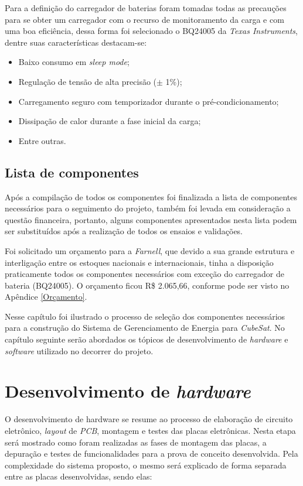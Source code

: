 \documentclass[
	12pt,				%
	openright,			%
	oneside,			%
	a4paper,			%
	english,			%
	french,				%
	spanish,			%
	brazil,				%
	oldfontcommands
	]{abntex2}
\begin{document}
	Para a definição do carregador de baterias foram tomadas todas as precauções para se obter um carregador com o recurso de monitoramento da carga e com uma boa eficiência, dessa forma foi selecionado o BQ24005 da \textit{Texas Instruments}, dentre suas características destacam-se:
	
	\begin{itemize}
		\item Baixo consumo em \textit{sleep mode};
		\item Regulação de tensão de alta precisão ($\pm$ 1\%);
		\item Carregamento seguro com temporizador durante o pré-condicionamento;
		\item Dissipação de calor durante a fase inicial da carga;
		\item Entre outras.
	\end{itemize}
	
\subsection[Lista de componentes]{Lista de componentes}

	Após a compilação de todos os componentes foi finalizada a lista de componentes necessários para o seguimento do projeto, também foi levada em consideração a questão financeira, portanto, alguns componentes apresentados nesta lista podem ser substituídos após a realização de todos os ensaios e validações.
		
	Foi solicitado um orçamento para a \textit{Farnell}, que devido a sua grande estrutura e interligação entre os estoques nacionais e internacionais, tinha a disposição praticamente todos os componentes necessários com exceção do carregador de bateria (BQ24005). O orçamento ficou R\$ 2.065,66, conforme pode ser visto no Apêndice \ref{Orçamento}.	
	
	Nesse capítulo foi ilustrado o processo de seleção dos componentes necessários para a construção do Sistema de Gerenciamento de Energia para \textit{CubeSat}. No capítulo seguinte serão abordados os tópicos de desenvolvimento de \textit{hardware} e \textit{software} utilizado no decorrer do projeto.
	
\section[Desenvolvimento de hardware]{Desenvolvimento de \textit{hardware}}

	O desenvolvimento de hardware se resume ao processo de elaboração de circuito eletrônico, \textit{layout} de \textit{PCB}, montagem e testes das placas eletrônicas. Nesta etapa será mostrado como foram realizadas as fases de montagem das placas, a depuração e testes de funcionalidades para a prova de conceito desenvolvida. Pela complexidade do sistema proposto, o mesmo será explicado de forma separada entre as placas desenvolvidas, sendo elas:
	
\end{document}
